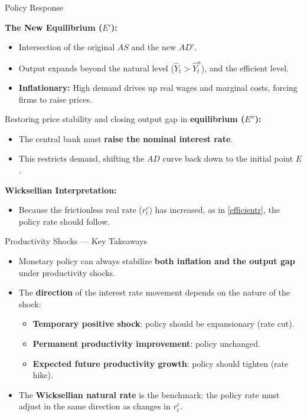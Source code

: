 \documentclass[11pt,aspectratio=169]{beamer}
\begin{document}
\begin{frame}[label=NewsShockPolicy]{Policy Response}
\small

\textbf{The New Equilibrium ($E'$):}
\begin{itemize}
    \item Intersection of the original $AS$ and the new $AD'$.
    \item Output expands beyond the natural level ($\hat{Y}_t > \hat{Y}_t^n$), and the efficient level.
    \item \textbf{Inflationary:} High demand drives up real wages and marginal costs, forcing firms to raise prices.
\end{itemize}

Restoring price stability and closing output gap in \textbf{equilibrium ($E''$):}
\begin{itemize}
    \item The central bank must \textbf{raise the nominal interest rate}.
    \item This restricts demand, shifting the $AD$ curve back down to the initial point $E$.
\end{itemize}

\textbf{Wicksellian Interpretation:}
\begin{itemize}
    \item Because the frictionless real rate ($r^e_t$) has increased, as in \eqref{efficientr}, the policy rate should follow.
\end{itemize}

\end{frame}
\begin{frame}{Productivity Shocks — Key Takeaways}

\begin{itemize}
\item Monetary policy can always stabilize \textbf{both inflation and the output gap} under productivity shocks.
\vspace{0.3cm}
\item The \textbf{direction} of the interest rate movement depends on the nature of the shock:
\begin{itemize}
\item \textbf{Temporary positive shock}: policy should be expansionary (rate cut).
\item \textbf{Permanent productivity improvement}: policy unchanged.
\item \textbf{Expected future productivity growth}: policy should tighten (rate hike).
\end{itemize}
\vspace{0.3cm}
\item The \textbf{Wicksellian natural rate} is the benchmark: the policy rate must adjust in the same direction as changes in $r^e_t$.
\end{itemize}

\end{frame}
\end{document}
